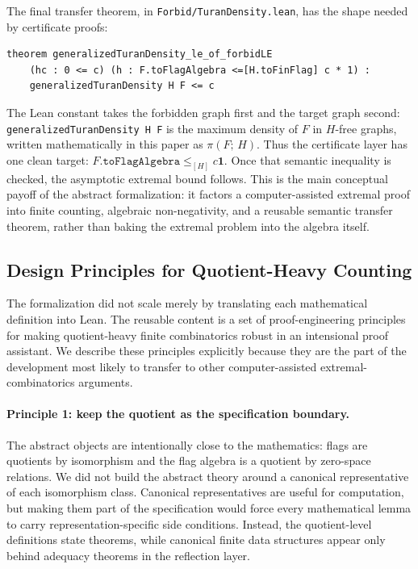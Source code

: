 \documentclass{article}
\newcommand{\tdensity}[2]{\pi(#1;\,#2)}
\newcommand{\lean}[1]{\texttt{#1}}
\begin{document}
The final transfer theorem, in \lean{Forbid/TuranDensity.lean}, has the shape
needed by certificate proofs:
\begin{lstlisting}
theorem generalizedTuranDensity_le_of_forbidLE
    (hc : 0 <= c) (h : F.toFlagAlgebra <=[H.toFinFlag] c * 1) :
    generalizedTuranDensity H F <= c
\end{lstlisting}
The Lean constant takes the forbidden graph first and the target graph
second: \lean{generalizedTuranDensity H F} is the maximum density of $F$ in
$H$-free graphs, written mathematically in this paper as $\tdensity{F}{H}$.
Thus the certificate layer has one clean target:
$F.\lean{toFlagAlgebra} \leq_{[H]} c\mathbf{1}$.  Once that semantic inequality
is checked, the asymptotic extremal bound follows.  This is the main conceptual
payoff of the abstract formalization: it factors a computer-assisted extremal
proof into finite counting, algebraic non-negativity, and a reusable semantic
transfer theorem, rather than baking the extremal problem into the algebra
itself.


\subsection{Design Principles for Quotient-Heavy Counting}
\label{sec:design-principles}

The formalization did not scale merely by translating each mathematical
definition into Lean.  The reusable content is a set of proof-engineering
principles for making quotient-heavy finite combinatorics robust in an
intensional proof assistant.  We describe these principles explicitly because
they are the part of the development most likely to transfer to other
computer-assisted extremal-combinatorics arguments.

\paragraph{Principle 1: keep the quotient as the specification boundary.}
The abstract objects are intentionally close to the mathematics: flags are
quotients by isomorphism and the flag algebra is a quotient by zero-space
relations.  We did not build the abstract theory around a canonical
representative of each isomorphism class.  Canonical representatives are useful
for computation, but making them part of the specification would force every
mathematical lemma to carry representation-specific side conditions.  Instead,
the quotient-level definitions state theorems, while canonical finite data
structures appear only behind adequacy theorems in the reflection layer.
\end{document}
